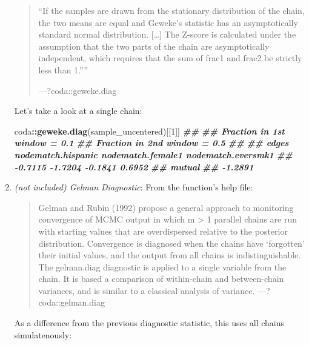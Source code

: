 \documentclass[
]{book}
\newenvironment{Shaded}{\begin{snugshade}}{\end{snugshade}}
\newcommand{\DecValTok}[1]{\textcolor[rgb]{0.00,0.00,0.81}{#1}}
\newcommand{\DocumentationTok}[1]{\textcolor[rgb]{0.56,0.35,0.01}{\textbf{\textit{#1}}}}
\newcommand{\FunctionTok}[1]{\textcolor[rgb]{0.13,0.29,0.53}{\textbf{#1}}}
\newcommand{\NormalTok}[1]{#1}
\newcommand{\SpecialCharTok}[1]{\textcolor[rgb]{0.81,0.36,0.00}{\textbf{#1}}}
\begin{document}
\begin{enumerate}
  \begin{quote}
  ``If the samples are drawn from the stationary distribution of the chain, the two means are equal and Geweke's statistic has an asymptotically standard normal distribution. {[}\ldots{]}
  The Z-score is calculated under the assumption that the two parts of the chain are asymptotically independent, which requires that the sum of frac1 and frac2 be strictly less than 1.''''

  ---?coda::geweke.diag
  \end{quote}

  Let's take a look at a single chain:

\begin{Shaded}
\begin{Highlighting}[]
\NormalTok{coda}\SpecialCharTok{::}\FunctionTok{geweke.diag}\NormalTok{(sample\_uncentered)[[}\DecValTok{1}\NormalTok{]]}
\DocumentationTok{\#\# }
\DocumentationTok{\#\# Fraction in 1st window = 0.1}
\DocumentationTok{\#\# Fraction in 2nd window = 0.5 }
\DocumentationTok{\#\# }
\DocumentationTok{\#\#              edges nodematch.hispanic  nodematch.female1 nodematch.eversmk1 }
\DocumentationTok{\#\#            {-}0.7115            {-}1.7204            {-}0.1841             0.6952 }
\DocumentationTok{\#\#             mutual }
\DocumentationTok{\#\#            {-}1.2891}
\end{Highlighting}
\end{Shaded}
\item
  \emph{(not included) Gelman Diagnostic}: From the function's help file:

  \begin{quote}
  Gelman and Rubin (1992) propose a general approach to monitoring convergence of MCMC output in which m \textgreater{} 1 parallel chains are run with starting values that are overdispersed relative to the posterior distribution. Convergence is diagnosed when the chains have `forgotten' their initial values, and the output from all chains is indistinguishable. The gelman.diag diagnostic is applied to a single variable from the chain. It is based a comparison of within-chain and between-chain variances, and is similar to a classical analysis of variance.
  ---?coda::gelman.diag
  \end{quote}

  As a difference from the previous diagnostic statistic, this uses all chains simulatenously:


\end{enumerate}
\end{document}
